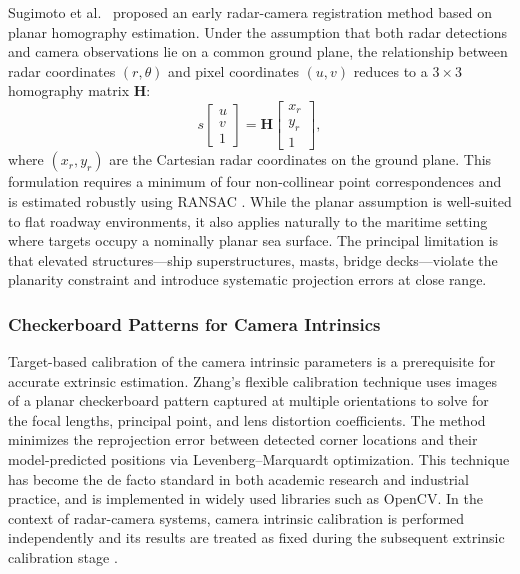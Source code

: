 Sugimoto et al.\ \cite{sugimoto2004obstacle} proposed an early radar-camera registration method based on planar homography estimation. Under the assumption that both radar detections and camera observations lie on a common ground plane, the relationship between radar coordinates $(r, \theta)$ and pixel coordinates $(u, v)$ reduces to a $3\times3$ homography matrix $\mathbf{H}$:
\begin{equation}\label{eq:homography}
  s\begin{bmatrix}u\\v\\1\end{bmatrix}
  = \mathbf{H}\begin{bmatrix}x_r\\y_r\\1\end{bmatrix},
\end{equation}
where $(x_r, y_r)$ are the Cartesian radar coordinates on the ground plane. This formulation requires a minimum of four non-collinear point correspondences and is estimated robustly using RANSAC \cite{fischler1981random}. While the planar assumption is well-suited to flat roadway environments, it also applies naturally to the maritime setting where targets occupy a nominally planar sea surface. The principal limitation is that elevated structures---ship superstructures, masts, bridge decks---violate the planarity constraint and introduce systematic projection errors at close range.

\subsubsection{Checkerboard Patterns for Camera Intrinsics}

Target-based calibration of the camera intrinsic parameters is a prerequisite for accurate extrinsic estimation. Zhang's flexible calibration technique \cite{zhang2000flexible} uses images of a planar checkerboard pattern captured at multiple orientations to solve for the focal lengths, principal point, and lens distortion coefficients. The method minimizes the reprojection error between detected corner locations and their model-predicted positions via Levenberg--Marquardt optimization. This technique has become the de facto standard in both academic research and industrial practice, and is implemented in widely used libraries such as OpenCV. In the context of radar-camera systems, camera intrinsic calibration is performed independently and its results are treated as fixed during the subsequent extrinsic calibration stage \cite{Caesar2020nuScenes, Geiger2012KITTI}.

